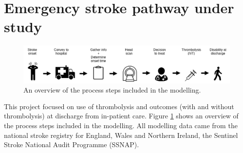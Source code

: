 \section{Emergency stroke pathway under study}

\begin{figure}
    \centering
    \includegraphics[width=1.0\linewidth]{images/flow}
    \caption{An overview of the process steps included in the modelling.}
    \label{fig:flow}
\end{figure}

This project focused on use of thrombolysis and outcomes (with and without thrombolysis) at discharge from in-patient care. Figure \ref{fig:flow} shows an overview of the process steps included in the modelling. All modelling data came from the national stroke registry for England, Wales and Northern Ireland, the Sentinel Stroke National Audit Programme (SSNAP).

